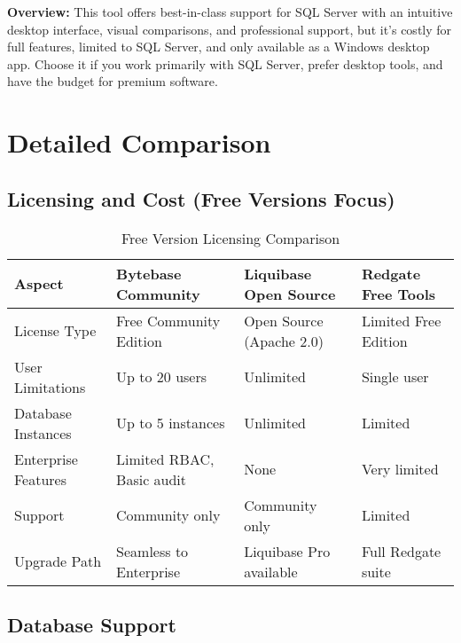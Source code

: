 \documentclass[11pt,a4paper]{article}
\begin{document}
\textbf{Overview:}
This tool offers best-in-class support for SQL Server with an intuitive desktop interface, visual comparisons, and professional support, but it’s costly for full features, limited to SQL Server, and only available as a Windows desktop app.
Choose it if you work primarily with SQL Server, prefer desktop tools, and have the budget for premium software.

\newpage
\section{Detailed Comparison}

\subsection{Licensing and Cost (Free Versions Focus)}

\begin{table}[h!]
\centering
\begin{tabularx}{\textwidth}{|X|X|X|X|}
\hline
\textbf{Aspect} & \textbf{Bytebase Community} & \textbf{Liquibase Open Source} & \textbf{Redgate Free Tools} \\
\hline
License Type & Free Community Edition & Open Source (Apache 2.0) & Limited Free Edition \\
\hline
User Limitations & Up to 20 users & Unlimited & Single user \\
\hline
Database Instances & Up to 5 instances & Unlimited & Limited \\
\hline
Enterprise Features & Limited RBAC, Basic audit & None & Very limited \\
\hline
Support & Community only & Community only & Limited \\
\hline
Upgrade Path & Seamless to Enterprise & Liquibase Pro available & Full Redgate suite \\
\hline
\end{tabularx}
\caption{Free Version Licensing Comparison}
\end{table}

\subsection{Database Support}
\end{document}
